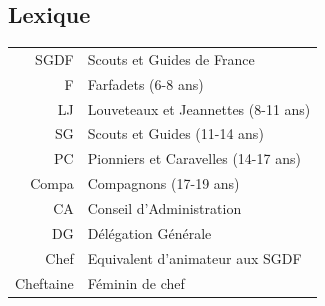 \documentclass[a4paper, 12pt]{article}
\begin{document}
\subsection*{Lexique}
\begin{tabular}{rl}
  SGDF & Scouts et Guides de France\\
  F & Farfadets (6-8 ans)\\
  LJ & Louveteaux et Jeannettes (8-11 ans)\\
  SG & Scouts et Guides (11-14 ans)\\
  PC & Pionniers et Caravelles (14-17 ans)\\
  Compa & Compagnons (17-19 ans)\\
  CA & Conseil d'Administration\\
  DG & Délégation Générale\\
  Chef & Equivalent d'animateur aux SGDF\\
  Cheftaine & Féminin de chef\\
\end{tabular}
  
\end{document}
